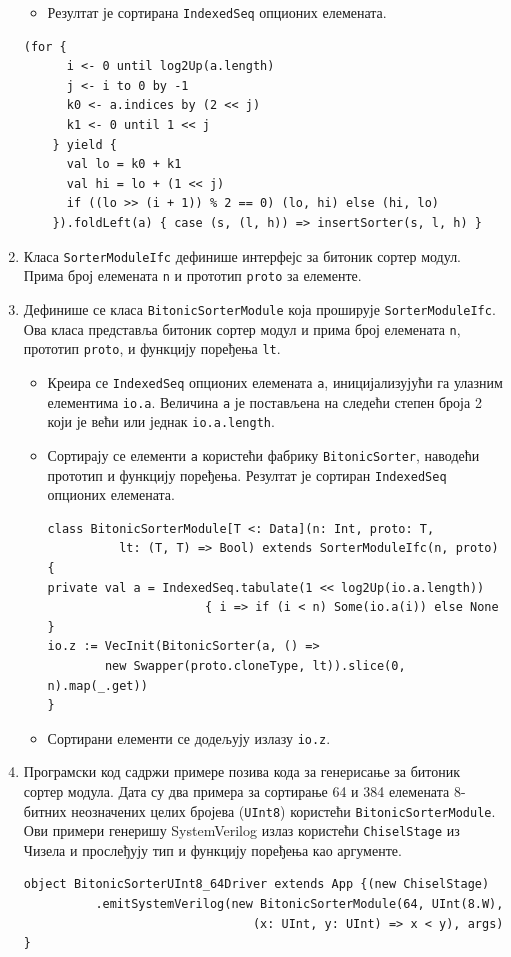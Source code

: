 \documentclass[12pt, a4paper]{article}
\theoremstyle{definition}
\begin{document}
\begin{enumerate}
\begin{itemize}
\item Резултат је сортирана \verb+IndexedSeq+ опционих елемената.
\end{itemize}

\begin{verbatim}
(for {
      i <- 0 until log2Up(a.length)
      j <- i to 0 by -1
      k0 <- a.indices by (2 << j)
      k1 <- 0 until 1 << j
    } yield {
      val lo = k0 + k1
      val hi = lo + (1 << j)
      if ((lo >> (i + 1)) % 2 == 0) (lo, hi) else (hi, lo)
    }).foldLeft(a) { case (s, (l, h)) => insertSorter(s, l, h) }
\end{verbatim}


\item Класа \verb+SorterModuleIfc+ дефинише интерфејс за битоник сортер модул. Прима број елемената \verb+n+ и прототип \verb+proto+ за елементе.

\item Дефинише се класа \verb+BitonicSorterModule+ која проширује \verb+SorterModuleIfc+. Ова класа представља битоник сортер модул и прима број елемената \verb+n+, прототип \verb+proto+, и функцију поређења \verb+lt+.

\begin{itemize}
\item Креира се \verb+IndexedSeq+ опционих елемената \verb+a+, иницијализујући га улазним елементима \verb+io.a+. Величина \verb+a+ је постављена на следећи степен броја 2 који је већи или једнак \verb+io.a.length+.

\item Сортирају се елементи \verb+a+ користећи фабрику \verb+BitonicSorter+, наводећи прототип и функцију поређења. Резултат је сортиран \verb+IndexedSeq+ опционих елемената.

\begin{verbatim}
class BitonicSorterModule[T <: Data](n: Int, proto: T,
          lt: (T, T) => Bool) extends SorterModuleIfc(n, proto) {
private val a = IndexedSeq.tabulate(1 << log2Up(io.a.length))
                      { i => if (i < n) Some(io.a(i)) else None }
io.z := VecInit(BitonicSorter(a, () =>
        new Swapper(proto.cloneType, lt)).slice(0, n).map(_.get))
}
\end{verbatim}

\item Сортирани елементи се додељују излазу \verb+io.z+.
\end{itemize}


\item Програмски код садржи примере позива кода за генерисање за битоник сортер модула. Дата су два примера за сортирање 64 и 384 елемената 8-битних неозначених целих бројева (\verb+UInt8+) користећи \verb+BitonicSorterModule+.
\newpage
Ови примери генеришу SystemVerilog излаз користећи \verb+ChiselStage+ из Чизела и прослеђују тип и функцију поређења као аргументе.
\begin{verbatim}
object BitonicSorterUInt8_64Driver extends App {(new ChiselStage)
          .emitSystemVerilog(new BitonicSorterModule(64, UInt(8.W),
                                (x: UInt, y: UInt) => x < y), args)
}
\end{verbatim}


\end{enumerate}
\end{document}
